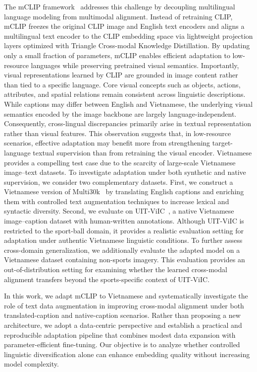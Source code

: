 The mCLIP framework~\cite{chen-etal-2023-mclip} addresses this challenge by decoupling multilingual language modeling from multimodal alignment. Instead of retraining CLIP, mCLIP freezes the original CLIP image and English text encoders and aligns a multilingual text encoder to the CLIP embedding space via lightweight projection layers optimized with Triangle Cross-modal Knowledge Distillation. By updating only a small fraction of parameters, mCLIP enables efficient adaptation to low-resource languages while preserving pretrained visual semantics. Importantly, visual representations learned by CLIP are grounded in image content rather than tied to a specific language. Core visual concepts such as objects, actions, attributes, and spatial relations remain consistent across linguistic descriptions. While captions may differ between English and Vietnamese, the underlying visual semantics encoded by the image backbone are largely language-independent. Consequently, cross-lingual discrepancies primarily arise in textual representation rather than visual features. This observation suggests that, in low-resource scenarios, effective adaptation may benefit more from strengthening target-language textual supervision than from retraining the visual encoder. Vietnamese provides a compelling test case due to the scarcity of large-scale Vietnamese image--text datasets. To investigate adaptation under both synthetic and native supervision, we consider two complementary datasets. First, we construct a Vietnamese version of Multi30k~\cite{elliott2016multi30k} by translating English captions and enriching them with controlled text augmentation techniques to increase lexical and syntactic diversity. Second, we evaluate on UIT-ViIC~\cite{lam2020uitviicdatasetevaluationvietnamese}, a native Vietnamese image--caption dataset with human-written annotations. Although UIT-ViIC is restricted to the sport-ball domain, it provides a realistic evaluation setting for adaptation under authentic Vietnamese linguistic conditions. To further assess cross-domain generalization, we additionally evaluate the adapted model on a Vietnamese dataset containing non-sports imagery. This evaluation provides an out-of-distribution setting for examining whether the learned cross-modal alignment transfers beyond the sports-specific context of UIT-ViIC.


In this work, we adapt mCLIP to Vietnamese and systematically investigate the role of text data augmentation in improving cross-modal alignment under both translated-caption and native-caption scenarios. Rather than proposing a new architecture, we adopt a data-centric perspective and establish a practical and reproducible adaptation pipeline that combines modest data expansion with parameter-efficient fine-tuning. Our objective is to analyze whether controlled linguistic diversification alone can enhance embedding quality without increasing model complexity.

